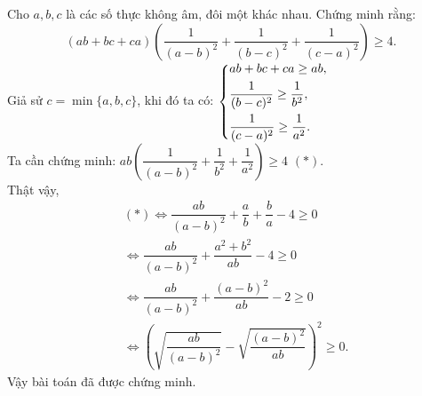 \begin{ex}%
    Cho $a,b,c$ là các số thực không âm, đôi một khác nhau. Chứng minh rằng:
    $$\left(ab+bc+ca \right)\left(\dfrac{1}{(a-b)^2}+\dfrac{1}{(b-c)^2}+\dfrac{1}{(c-a)^2} \right) \geq 4.$$
\loigiai
    {Giả sử $c=\min \{a,b,c\}$, khi đó ta có: $\left\{\begin{aligned}&ab+bc+ca \geq ab,\\&\dfrac{1}{(b-c)^2} \geq \dfrac{1}{b^2},\\&\dfrac{1}{(c-a)^2} \geq \dfrac{1}{a^2}.\end{aligned}\right.$\\
    Ta cần chứng minh:  $ab\left(\dfrac{1}{(a-b)^2}+\dfrac{1}{b^2}+\dfrac{1}{a^2} \right) \geq 4$ $(\ast)$.\\
    Thật vậy,\\
    $$
    \begin{aligned}
    &(\ast) \Leftrightarrow \dfrac{ab}{(a-b)^2}+\dfrac{a}{b}+\dfrac{b}{a}-4 \geq 0 \\
    & \Leftrightarrow \dfrac{ab}{(a-b)^2}+\dfrac{a^2+b^2}{ab}-4 \geq 0 \\
    & \Leftrightarrow \dfrac{ab}{(a-b)^2}+\dfrac{(a-b)^2}{ab}-2 \geq 0 \\
     & \Leftrightarrow \left( \sqrt{\dfrac{ab}{(a-b)^2}}-\sqrt{\dfrac{(a-b)^2}{ab}}\right)^2 \geq 0.
    \end{aligned}
    $$
    Vậy bài toán đã được chứng minh.
    }
\end{ex}

